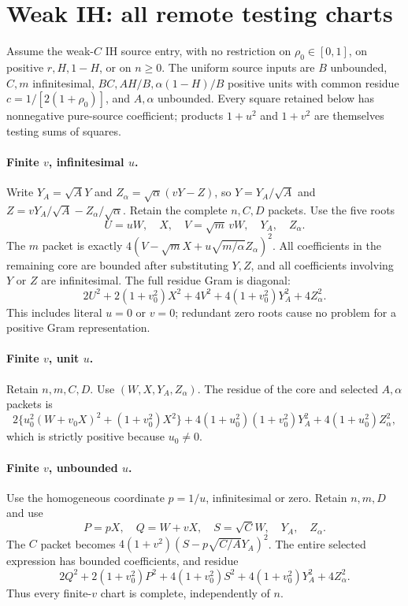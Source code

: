 \section{\texorpdfstring{Weak IH: all remote testing charts}{Weak IH: all remote testing charts}}
\label{component:p0fb32cd2f1bc}

\label{p0fb32cd2f1bc:sec:weak-ih-remote}
Assume the weak-$C$ IH source entry, with no restriction on
$\rho_0\in[0,1]$, on positive $r,H,1-H$, or on $n\ge0$.
The uniform source inputs are $B$ unbounded, $C,m$ infinitesimal,
$BC,AH/B,\alpha(1-H)/B$ positive units with common residue
$c=1/[2(1+\rho_0)]$, and $A,\alpha$ unbounded.
Every square retained below has nonnegative pure-source coefficient;
products $1+u^2$ and $1+v^2$ are themselves testing sums of squares.

\paragraph{Finite $v$, infinitesimal $u$.}
Write $Y_A=\sqrt A Y$ and $Z_\alpha=\sqrt\alpha(vY-Z)$, so
$Y=Y_A/\sqrt A$ and $Z=vY_A/\sqrt A-Z_\alpha/\sqrt\alpha$.
Retain the complete $n,C,D$ packets. Use the five roots
\[
 U=uW,\quad X,\quad V=\sqrt m\,vW,\quad Y_A,\quad Z_\alpha.
\]
The $m$ packet is exactly
$4(V-\sqrt m X+u\sqrt{m/\alpha}Z_\alpha)^2$.
All coefficients in the remaining core are bounded after substituting
$Y,Z$, and all coefficients involving $Y$ or $Z$ are infinitesimal.
The full residue Gram is diagonal:
\[
 2U^2+2(1+v_0^2)X^2+4V^2
       +4(1+v_0^2)Y_A^2+4Z_\alpha^2.
\tag{IR1}
\]
This includes literal $u=0$ or $v=0$; redundant zero roots cause no
problem for a positive Gram representation.

\paragraph{Finite $v$, unit $u$.}
Retain $n,m,C,D$. Use $(W,X,Y_A,Z_\alpha)$.
The residue of the core and selected $A,\alpha$ packets is
\[
 2\{u_0^2(W+v_0X)^2+(1+v_0^2)X^2\}
       +4(1+u_0^2)(1+v_0^2)Y_A^2
       +4(1+u_0^2)Z_\alpha^2,
\tag{IR2}
\]
which is strictly positive because $u_0\ne0$.

\paragraph{Finite $v$, unbounded $u$.}
Use the homogeneous coordinate $p=1/u$, infinitesimal or zero.
Retain $n,m,D$ and use
\[
 P=pX,\quad Q=W+vX,\quad S=\sqrt C W,\quad Y_A,\quad Z_\alpha.
\]
The $C$ packet becomes
$4(1+v^2)(S-p\sqrt{C/A}Y_A)^2$.
The entire selected expression has bounded coefficients, and residue
\[
 2Q^2+2(1+v_0^2)P^2+4(1+v_0^2)S^2
       +4(1+v_0^2)Y_A^2+4Z_\alpha^2.
\tag{IR3}
\]
Thus every finite-$v$ chart is complete, independently of $n$.

